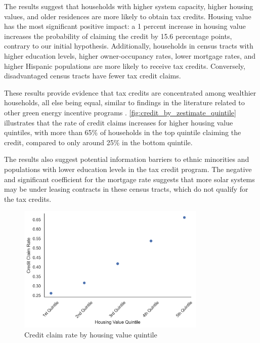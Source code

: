 \documentclass[12pt,twoside,letterpaper]{article}
\begin{document}
The results suggest that households with higher system capacity, higher housing values, and older residences are more likely to obtain tax credits. Housing value has the most significant positive impact: a 1 percent increase in housing value increases the probability of claiming the credit by 15.6 percentage points, contrary to our initial hypothesis. Additionally, households in census tracts with higher education levels, higher owner-occupancy rates, lower mortgage rates, and higher Hispanic populations are more likely to receive tax credits. Conversely, disadvantaged census tracts have fewer tax credit claims.

These results provide evidence that tax credits are concentrated among wealthier households, all else being equal, similar to findings in the literature related to other green energy incentive programs \parencite{borenstein_distributional_2016}. \autoref{fig:credit_by_zestimate_quintile} illustrates that the rate of credit claims increases for higher housing value quintiles, with more than 65\% of households in the top quintile claiming the credit, compared to only around 25\% in the bottom quintile. 

The results also suggest potential information barriers to ethnic minorities and populations with lower education levels in the tax credit program. The negative and significant coefficient for the mortgage rate suggests that more solar systems may be under leasing contracts in these census tracts, which do not qualify for the tax credits.

\begin{figure}[!ht]
    \centering
\includegraphics[width=0.8\textwidth]{figures/credit_by_zestimate_quintile.png}
    \caption{Credit claim rate by housing value quintile}
    \label{fig:credit_by_zestimate_quintile}
\end{figure}
\end{document}
